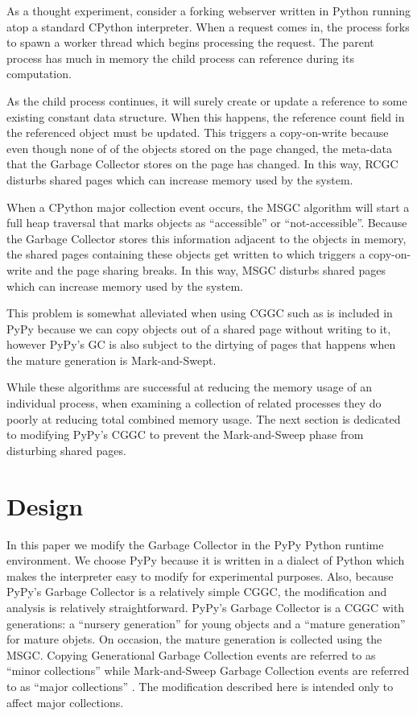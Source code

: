 \documentclass{article}
\begin{document}
\begin{sloppypar}
As a thought experiment, consider a forking webserver written in Python running atop a standard CPython interpreter.  When a request comes in, the process forks to spawn a worker thread which begins processing the request.  The parent process has much in memory the child process can reference during its computation.  

As the child process continues, it will surely create or update a reference to some existing constant data structure.  When this happens, the reference count field in the referenced object must be updated.  This triggers a copy-on-write because even though none of of the objects stored on the page changed, the meta-data that the Garbage Collector stores on the page has changed.  In this way, RCGC disturbs shared pages which can increase memory used by the system.

When a CPython major collection event occurs, the MSGC algorithm will start a full heap traversal that marks objects as ``accessible'' or ``not-accessible''.  Because the Garbage Collector stores this information adjacent to the objects in memory, the shared pages containing these objects get written to which triggers a copy-on-write and the page sharing breaks.  In this way, MSGC disturbs shared pages which can increase memory used by the system.

This problem is somewhat alleviated when using CGGC such as is included in PyPy because we can copy objects out of a shared page without writing to it, however PyPy's GC is also subject to the dirtying of pages that happens when the mature generation is Mark-and-Swept.  

While these algorithms are successful at reducing the memory usage of an individual process, when examining a collection of related processes they do poorly at reducing total combined memory usage.  The next section is dedicated to modifying PyPy's CGGC to prevent the Mark-and-Sweep phase from disturbing shared pages.  

\section{Design}\label{sec:design}

In this paper we modify the Garbage Collector in the PyPy Python runtime environment.  We choose PyPy because it is written in a dialect of Python which makes the interpreter easy to modify for experimental purposes.  Also, because PyPy's Garbage Collector is a relatively simple CGGC, the modification and analysis is relatively straightforward.  PyPy's Garbage Collector is a CGGC with generations: a ``nursery generation'' for young objects and a ``mature generation'' for mature objets.  On occasion, the mature generation is collected using the MSGC.  Copying Generational Garbage Collection events are referred to as ``minor collections'' while Mark-and-Sweep Garbage Collection events are referred to as ``major collections'' \cite{pypy-doc}.  The modification described here is intended only to affect major collections.


\end{sloppypar}
\end{document}
